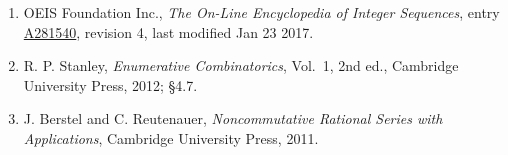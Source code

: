 \documentclass[11pt]{article}
\theoremstyle{definition}
\begin{document}
\begin{enumerate}

\item OEIS Foundation Inc., \emph{The On-Line Encyclopedia of Integer Sequences}, entry \href{https://oeis.org/A281540}{A281540}, revision 4, last modified Jan 23 2017.

\item R. P. Stanley, \emph{Enumerative Combinatorics}, Vol.~1, 2nd ed., Cambridge University Press, 2012; \S4.7.

\item J. Berstel and C. Reutenauer, \emph{Noncommutative Rational Series with Applications}, Cambridge University Press, 2011.

\end{enumerate}
\end{document}
